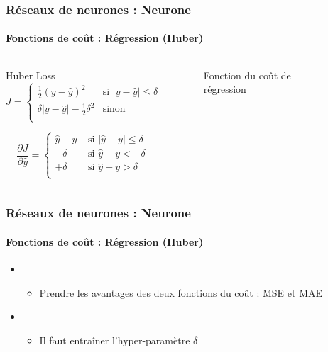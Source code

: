 \documentclass[xcolor=table]{beamer}
\begin{document}
\begin{frame}
\frametitle{Réseaux de neurones : Neurone}
\framesubtitle{Fonctions de coût : Régression (Huber)}

\begin{columns}
\begin{column}{.68\linewidth}
\begin{block}{Huber Loss}
	\[J = %
	\begin{cases}
	\frac{1}{2} (y - \hat{y})^2 & \text{si } |y - \hat{y}| \le \delta \\
	\delta |y - \hat{y}| - \frac{1}{2} \delta^2 & \text{sinon }\\
	\end{cases}
	\]
	
	\[
	\frac{\partial J}{\partial \hat{y}} = 
	\begin{cases}
	\hat{y} - y & \text{ si } |\hat{y} - y| \le \delta \\
	-\delta & \text{ si } \hat{y} - y < -\delta \\
	+\delta & \text{ si } \hat{y} - y > \delta \\
	\end{cases}
	\]
	
\end{block}

\end{column}%
\begin{column}{.3\linewidth}
\begin{figure}
	\caption{Fonction du coût de régression \cite{2017-rosenberg}}
\end{figure}
\end{column}
\end{columns}

\end{frame}

\begin{frame}
\frametitle{Réseaux de neurones : Neurone}
\framesubtitle{Fonctions de coût : Régression (Huber)}

\begin{itemize}
	\item {}
	\begin{itemize}
		\item Prendre les avantages des deux fonctions du coût : MSE et MAE
	\end{itemize}
	\item {}
	\begin{itemize}
		\item Il faut entraîner l'hyper-paramètre $\delta$
	\end{itemize}
\end{itemize}

\end{frame}
\end{document}
